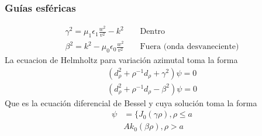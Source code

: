 \subsubsection{Guías esféricas}
\begin{subequations}
	\begin{align}
	\gamma^2 =  \mu_{1} \epsilon_{1} \frac{w^2}{v^2} - k^2   && \text{  Dentro}\\
	\beta^2 = k^2 - \mu_{0} \epsilon_{0} \frac{w^2}{v^2}   && \text{ Fuera (onda desvaneciente)}
		\end{align}
	\end{subequations}
La ecuacion de Helmholtz para variación azimutal toma la forma
\begin{subequations}
	\begin{align}
		(d_{\rho}^2+\rho^{-1} d_{\rho}+\gamma^2) \psi = 0\\
			(d_{\rho}^2+\rho^{-1} d_{\rho}-\beta^2) \psi = 0
	\end{align}
\end{subequations}
Que es la ecuación diferencial de Bessel y cuya solución toma la forma
\begin{equation} \label{Soluciones metalico bessel}
\begin{split}
	\psi  & = \bigg \{ J_{0} (\gamma \rho), \rho \leq a\\
          &   A k_{0} (\beta \rho), \rho > a
\end{split}
\end{equation}
